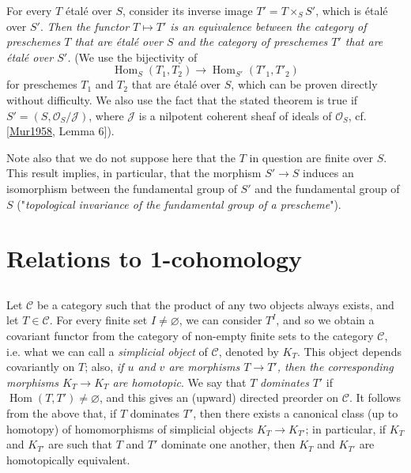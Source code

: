   For every \(T\) étalé over \(S\), consider its inverse image \(T'=T\times _S S'\), which is étalé over \(S'\).
  \emph{Then the functor \(T\mapsto  T'\) is an equivalence between the category of preschemes \(T\) that are étalé over \(S\) and the category of preschemes \(T'\) that are étalé over \(S'\).}
  (We use the bijectivity of
  \[     \operatorname {Hom}_S(T_1,T_2) \to  \operatorname {Hom}_{S'}(T'_1,T'_2)   \]
  for preschemes \(T_1\) and \(T_2\) that are étalé over \(S\), which can be proven directly without difficulty. We also use the fact that the stated theorem is true if \(S'=(S,\mathscr {O}_S/\mathscr {J})\), where \(\mathscr {J}\) is a nilpotent coherent sheaf of ideals of \(\mathscr {O}_S\), cf. [\hyperref[Mur1958]{Mur1958}, Lemma 6]).
  
  Note also that we do not suppose here that the \(T\) in question are finite over \(S\).
  This result implies, in particular, that the morphism \(S'\to  S\) induces an isomorphism between the fundamental group of \(S'\) and the fundamental group of \(S\) ("\emph{topological invariance of the fundamental group of a prescheme}").\section{Relations to 1-cohomology}\label{fga3.i-a.4}\subsection{}\label{fga3.i-a.4.a}\par{}Let \(\mathcal {C}\) be a category such that the product of any two objects always exists, and let \(T\in \mathcal {C}\).
  For every finite set \(I\neq \varnothing \), we can consider \(T^I\), and so we obtain a covariant functor from the category of non-empty finite sets to the category \(\mathcal {C}\), i.e. what we can call a \emph{simplicial object} of \(\mathcal {C}\), denoted by \(K_T\).
  This object depends covariantly on \(T\);
  also, \emph{if \(u\) and \(v\) are morphisms \(T\to  T'\), then the corresponding morphisms \(K_T\to  K_{T}\) are homotopic}.
  We say that \(T\) \emph{dominates} \(T'\) if \(\operatorname {Hom}(T,T')\neq \varnothing \), and this gives an (upward) directed preorder on \(\mathcal {C}\).
  It follows from the above that, if \(T\) dominates \(T'\), then there exists a canonical class (up to homotopy) of homomorphisms of simplicial objects \(K_T\to  K_{T'}\);
  in particular, if \(K_T\) and \(K_{T'}\) are such that \(T\) and \(T'\) dominate one another, then \(K_T\) and \(K_{T'}\) are homotopically equivalent.
